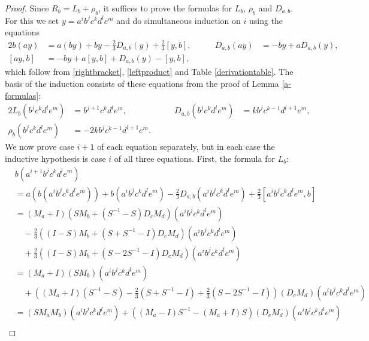 \documentclass{amsart}
\theoremstyle{plain}
\theoremstyle{definition}
\begin{document}
\begin{proof}
Since $R_b = L_b + \rho_b$, it suffices to prove the formulas for $L_b$,
$\rho_b$ and $D_{a,b}$. For this we set $y = a^i b^j c^k d^l e^m$ and do
simultaneous induction on $i$ using the equations
  \allowdisplaybreaks
  \begin{alignat*}{2}
  b(ay)
  &=
  a(by) + by - \tfrac23 D_{a,b}(y) + \tfrac23 [y,b],
  &\qquad
  D_{a,b}(ay)
  &=
  - by + a D_{a,b}(y),
  \\
  [ ay, b ]
  &=
  -by + a[y,b] + D_{a,b}(y) - [y,b],
  \end{alignat*}
which follow from \eqref{rightbracket}, \eqref{leftproduct} and Table
\ref{derivationtable}. The basis of the induction consists of these equations
from the proof of Lemma \ref{a-formulas}:
  \allowdisplaybreaks
  \begin{alignat*}{2}
  L_b ( b^j c^k d^l e^m )
  &=
  b^{j+1} c^k d^l e^m,
  &\qquad
  D_{a,b}( b^j  c^k d^l e^m )
  &=
  k b^j c^{k-1} d^{l+1} e^m,
  \\
  \rho_b( b^j c^k d^l e^m)
  &=
  - 2k b^j c^{k-1} d^{l+1} e^m.
  \end{alignat*}
We now prove case $i+1$ of each equation separately, but in each case the
inductive hypothesis is case $i$ of all three equations.  First, the formula
for $L_b$:
  \allowdisplaybreaks
  \begin{align*}
  &
  b ( a^{i+1} b^j c^k d^l e^m )
  \\
  &=
  a(b ( a^i b^j c^k d^l e^m ) )
  +
  b( a^i b^j c^k d^l e^m )
  -
  \tfrac23
  D_{a,b}( a^i b^j c^k d^l e^m )
  +
  \tfrac23
  [ a^i b^j c^k d^l e^m, b ]
  \\
  &=
  ( M_a + I )
  ( S M_b + ( S^{-1} - S ) D_c M_d )
  ( a^i b^j c^k d^l e^m )
  \\
  &\quad
  -
  \tfrac23
  (
  ( I - S ) M_b + ( S + S^{-1} - I ) D_c M_d
  )
  ( a^i b^j c^k d^l e^m )
  \\
  &\quad
  +
  \tfrac23
  (
  ( I - S ) M_b + ( S - 2 S^{-1} -  I ) D_c M_d
  )
  ( a^i b^j c^k d^l e^m )
  \\
  &=
  ( M_a + I ) ( S M_b )
  ( a^i b^j c^k d^l e^m )
  \\
  &\quad
  +
  (
  ( M_a {+} I ) ( S^{-1} {-} S )
  -
  \tfrac23
  ( S {+} S^{-1} {-} I )
  +
  \tfrac23
  ( S {-} 2S^{-1} {-} I )
  )
  ( D_c M_d )
  ( a^i b^j c^k d^l e^m )
  \\
  &=
  ( S M_a M_b )
  ( a^i b^j c^k d^l e^m )
  +
  ( (M_a - I) S^{-1} - (M_a + I) S )
  ( D_c M_d )
  ( a^i b^j c^k d^l e^m )
  \\

\end{align*}
\end{proof}
\end{document}
